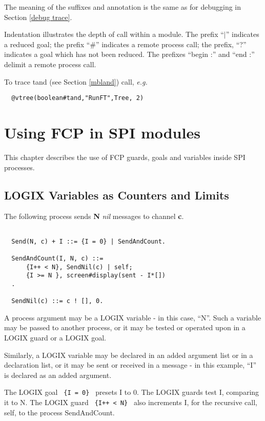 \noindent
The meaning of the suffixes and annotation is the same as for
debugging in Section \ref{debug trace}.

\noindent
Indentation illustrates the depth of call within a module.
The prefix ``$|$'' indicates a reduced goal; the prefix
``\#'' indicates a remote process call; the prefix,
``?''  indicates a goal which has not been reduced.  The
prefixes ``begin :'' and ``end :'' delimit a remote process
call.

\noindent
To trace tand (see Section \ref{mbland}) call, {\em e.g.}

\begin{verbatim}
  @vtree(boolean#tand,"RunFT",Tree, 2)
\end{verbatim}

\chapter{Using FCP in SPI modules}
\label{usingFCP}

This chapter describes the use of FCP guards, goals and
variables inside SPI processes.

\section{LOGIX Variables as Counters and Limits}
The following process sends {\bf N} {\em nil} messages to channel {\bf c}.

\begin{verbatim}

  Send(N, c) + I ::= {I = 0} | SendAndCount.

  SendAndCount(I, N, c) ::=
      {I++ < N}, SendNil(c) | self;
      {I >= N }, screen#display(sent - I*[])
  .

  SendNil(c) ::= c ! [], 0.
\end{verbatim}

\noindent
A process argument may be a LOGIX variable - in this case, ``N''.
Such a variable may be passed to another process, or it may be
tested or operated upon in a LOGIX guard or a LOGIX goal.

\noindent
Similarly, a LOGIX variable may be declared in an added argument
list or in a declaration list, or it may be sent or
received in a message - in this example, ``I'' is declared
as an added argument.

\noindent
The LOGIX goal \verb+ {I = 0} + presets I to 0.
\noindent
The LOGIX guards test I, comparing it to N.
The LOGIX guard \verb# {I++ < N} # also increments I, for the
recursive call, self, to the process SendAndCount.

